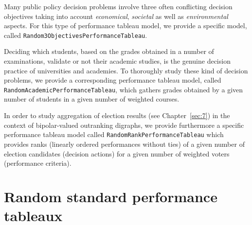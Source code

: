 Many public policy decision problems involve three often conflicting decision objectives taking into account \emph{economical}, \emph{societal} as well as \emph{environmental} aspects. For this type of performance tableau model, we provide a specific model, called \texttt{Random3ObjectivesPerformanceTableau}.

Deciding which students, based on the grades obtained in a number of examinations, validate or not their academic studies, is the genuine decision practice of universities and academies. To thoroughly study these kind of decision problems, we provide a corresponding performance tableau model, called \texttt{RandomAcademic\-PerformanceTableau}, which gathers grades obtained by a given number of students in a given number of weighted courses.    

In order to study aggregation of election results (see Chapter~\vref{sec:7}) in the context of bipolar-valued outranking digraphs, we provide furthermore a specific performance tableau model called \texttt{RandomRankPerformanceTableau} which provides ranks (linearly ordered performances without ties) of a given number of election candidates (decision actions) for a given number of weighted voters (performance criteria).
 
\section{Random standard performance tableaux}
\label{sec:6.2}
    
